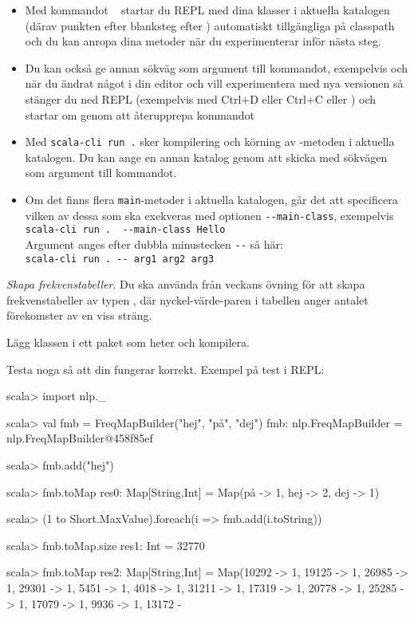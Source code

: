 \begin{itemize}
  \item
    Med kommandot ~ startar du REPL med dina klasser i aktuella katalogen (därav punkten efter blanksteg efter ) automatiskt tillgängliga på classpath och du kan anropa dina metoder när du experimenterar inför nästa steg. 
  \item
    Du kan också ge annan sökväg som argument till kommandot, exempelvis  och när du ändrat något i din editor och vill experimentera med nya versionen så stänger du ned REPL (exempelvis med Ctrl+D eller Ctrl+C eller ) och startar om genom att återupprepa kommandot 
  \item
    Med \texttt{scala-cli run .} sker kompilering och körning av -metoden i aktuella katalogen. Du kan ange en annan katalog genom att skicka med sökvägen som argument till kommandot. 
  \item
    Om det finns flera \texttt{main}-metoder i aktuella katalogen, går det att specificera vilken av dessa som ska exekveras med optionen \verb|--main-class|, exempelvis\\ \verb|scala-cli run .  --main-class Hello| \\ Argument anges efter dubbla minustecken \verb|--| så här: \\\verb|scala-cli run . -- arg1 arg2 arg3|
\end{itemize}


\Task \emph{Skapa frekvenstabeller}. Du ska använda  från veckans övning för att skapa frekvenstabeller av typen , där nyckel-värde-paren i tabellen anger antalet förekomster av en viss sträng.

\Subtask Lägg klassen  i ett paket som heter  och kompilera.

\begin{figure}[H]
\end{figure}

\Subtask Testa noga så att din  fungerar korrekt. Exempel på test i REPL:
\begin{REPL}
scala> import nlp._

scala> val fmb = FreqMapBuilder("hej", "på", "dej")
fmb: nlp.FreqMapBuilder = nlp.FreqMapBuilder@458f85ef

scala> fmb.add("hej")

scala> fmb.toMap
res0: Map[String,Int] = Map(på -> 1, hej -> 2, dej -> 1)

scala> (1 to Short.MaxValue).foreach(i => fmb.add(i.toString))

scala> fmb.toMap.size
res1: Int = 32770

scala> fmb.toMap
res2: Map[String,Int] = Map(10292 -> 1, 19125 -> 1, 26985 -> 1, 29301 -> 1, 5451 -> 1, 4018 -> 1, 31211 -> 1, 17319 -> 1, 20778 -> 1, 25285 -> 1, 17079 -> 1, 9936 -> 1, 13172 -
\end{REPL}

